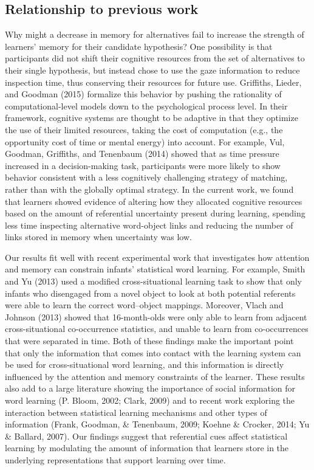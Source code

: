 \documentclass[authoryear, review]{elsarticle}
\begin{document}
\subsection{Relationship to previous
work}\label{relationship-to-previous-work}

Why might a decrease in memory for alternatives fail to increase the
strength of learners' memory for their candidate hypothesis? One
possibility is that participants did not shift their cognitive resources
from the set of alternatives to their single hypothesis, but instead
chose to use the gaze information to reduce inspection time, thus
conserving their resources for future use. Griffiths, Lieder, and
Goodman (2015) formalize this behavior by pushing the rationality of
computational-level models down to the psychological process level. In
their framework, cognitive systems are thought to be adaptive in that
they optimize the use of their limited resources, taking the cost of
computation (e.g., the opportunity cost of time or mental energy) into
account. For example, Vul, Goodman, Griffiths, and Tenenbaum (2014)
showed that as time pressure increased in a decision-making task,
participants were more likely to show behavior consistent with a less
cognitively challenging strategy of matching, rather than with the
globally optimal strategy. In the current work, we found that learners
showed evidence of altering how they allocated cognitive resources based
on the amount of referential uncertainty present during learning,
spending less time inspecting alternative word-object links and reducing
the number of links stored in memory when uncertainty was low.

Our results fit well with recent experimental work that investigates how
attention and memory can constrain infants' statistical word learning.
For example, Smith and Yu (2013) used a modified cross-situational
learning task to show that only infants who disengaged from a novel
object to look at both potential referents were able to learn the
correct word--object mappings. Moreover, Vlach and Johnson (2013) showed
that 16-month-olds were only able to learn from adjacent
cross-situational co-occurrence statistics, and unable to learn from
co-occurrences that were separated in time. Both of these findings make
the important point that only the information that comes into contact
with the learning system can be used for cross-situational word
learning, and this information is directly influenced by the attention
and memory constraints of the learner. These results also add to a large
literature showing the importance of social information for word
learning (P. Bloom, 2002; Clark, 2009) and to recent work exploring the
interaction between statistical learning mechanisms and other types of
information (Frank, Goodman, \& Tenenbaum, 2009; Koehne \& Crocker,
2014; Yu \& Ballard, 2007). Our findings suggest that referential cues
affect statistical learning by modulating the amount of information that
learners store in the underlying representations that support learning
over time.
\end{document}
